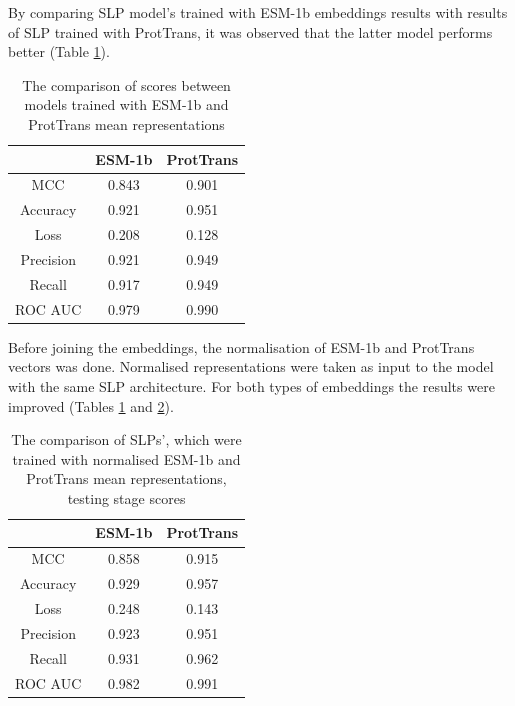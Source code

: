 \documentclass[12pt]{article}
\begin{document}
	By comparing SLP model's trained with ESM-1b embeddings results
	with results of SLP trained with ProtTrans, it was observed that 
	the latter model performs better (Table \ref{table:comparisonESMandPT}).

	\begin{table}[h!]
		\caption{The comparison of scores between models trained with ESM-1b
		and ProtTrans mean representations}
		\vspace{0.2cm}
		\centering
		\begin{tabular}{ | c | c c | }
			\hline 
						
			& ESM-1b & ProtTrans \\
			\hline 
			MCC & 0.843 & 0.901 \\
			Accuracy & 0.921 & 0.951 \\
			Loss & 0.208 & 0.128 \\
			Precision & 0.921 & 0.949 \\
			Recall & 0.917 & 0.949 \\
			ROC AUC & 0.979 & 0.990 \\
			\hline    
		\end{tabular}
		\label{table:comparisonESMandPT}
	\end{table}

	Before joining the embeddings, the normalisation of ESM-1b and ProtTrans 
	vectors was done. Normalised representations were taken as input to 
	the model with the same SLP architecture. For both types of embeddings 
	the results were improved (Tables \ref{table:comparisonESMandPT} and
	\ref{table:normalisedESMAndPTScores}).

	\begin{table}[h!]
		\caption{The comparison of SLPs', which were 
		trained with normalised ESM-1b and ProtTrans mean 
		representations, testing stage scores}
		\vspace{0.2cm}
		\centering
		\begin{tabular}{ | c | c c | }
			\hline 	
			& ESM-1b & ProtTrans \\
			\hline 
			MCC & 0.858 & 0.915 \\
			Accuracy & 0.929 & 0.957 \\
			Loss & 0.248 & 0.143 \\
			Precision & 0.923 & 0.951 \\
			Recall & 0.931 & 0.962 \\
			ROC AUC & 0.982 & 0.991 \\
			\hline    
		\end{tabular}
		\label{table:normalisedESMAndPTScores}
	\end{table}
\end{document}
